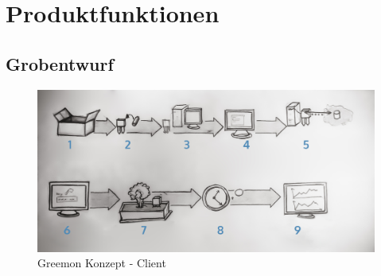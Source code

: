 \documentclass[pointlessnumbers]{scrartcl}
\begin{document}
\section{Produktfunktionen}

\newpage
\subsection{Grobentwurf}

\begin{figure}[htbp] 
  \centering
     \includegraphics[width=1\textwidth]{images/Skizze_Quickstartguide_numeriert.jpg}
  \caption{Greemon Konzept - Client}
  \label{fig:Bild1}
\end{figure}
\end{document}
